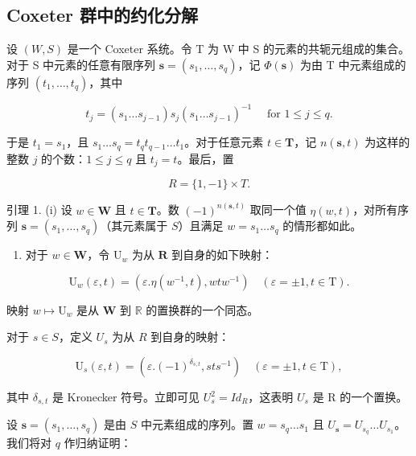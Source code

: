 \subsection{Coxeter 群中的约化分解}

设 \((W,S)\) 是一个 Coxeter 系统。令 T 为 W 中 S 的元素的共轭元组成的集合。对于 S 中元素的任意有限序列 \(\mathbf{s}=(s_{1},\ldots,s_{q})\)，记 \(\Phi(\mathbf{s})\) 为由 T 中元素组成的序列 \((t_{1},\ldots,t_{q})\)，其中

\[
t _ {j} = \left(s _ {1} \dots s _ {j - 1}\right) s _ {j} \left(s _ {1} \dots s _ {j - 1}\right) ^ {- 1} \quad \text { for } 1 \leqslant j \leqslant q.\tag{11}
\]

于是 \(t_1 = s_1\)，且 \(s_1 \ldots s_q = t_q t_{q-1} \ldots t_1\)。对于任意元素 \(t \in \mathbf{T}\)，记 \(n(\mathbf{s}, t)\) 为这样的整数 \(j\) 的个数：\(1 \leqslant j \leqslant q\) 且 \(t_j = t\)。最后，置

\[
R = \{1, - 1 \} \times T.
\]

引理 1. (i) 设 \(w \in \mathbf{W}\) 且 \(t \in \mathbf{T}\)。数 \((-1)^{n(\mathbf{s},t)}\) 取同一个值 \(\eta(w,t)\)，对所有序列 \(\mathbf{s} = (s_1, \ldots, s_q)\)（其元素属于 \(S\)）且满足 \(w = s_1 \ldots s_q\) 的情形都如此。

\begin{enumerate}
\def\labelenumi{(\roman{enumi})}
\setcounter{enumi}{1}
\tightlist
\item
  对于 \(w \in \mathbf{W}\)，令 \(\mathrm{U}_w\) 为从 \(\mathbf{R}\) 到自身的如下映射：
\end{enumerate}

\[
\mathrm{U} _ {w} (\varepsilon , t) = (\varepsilon . \eta (w ^ {- 1}, t), w t w ^ {- 1}) \quad (\varepsilon = \pm 1, t \in \mathrm{T}).\tag{12}
\]

映射 \(w \mapsto \mathrm{U}_w\) 是从 \(\mathbf{W}\) 到 \(\mathbb{R}\) 的置换群的一个同态。

对于 \(s \in S\)，定义 \(U_s\) 为从 \(R\) 到自身的映射：

\[
\mathrm{U} _ {s} (\varepsilon , t) = \left(\varepsilon . (- 1) ^ {\delta_ {s, t}}, s t s ^ {- 1}\right) \quad (\varepsilon = \pm 1, t \in \mathrm{T}),\tag{13}
\]

其中 \(\delta_{s,t}\) 是 Kronecker 符号。立即可见 \(U_{s}^{2} = Id_{R}\)，这表明 \(U_{s}\) 是 R 的一个置换。

设 \(\mathbf{s} = (s_1, \ldots, s_q)\) 是由 \(S\) 中元素组成的序列。置 \(w = s_q \ldots s_1\) 且 \(U_{\mathbf{s}} = U_{s_q} \ldots U_{s_1}\)。我们将对 \(q\) 作归纳证明：

